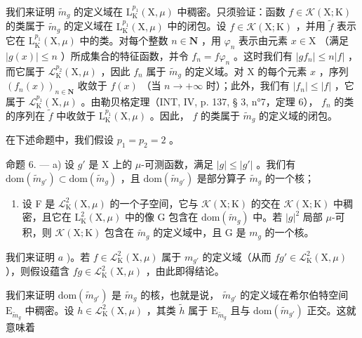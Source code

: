 我们来证明 \(\widetilde{m}_g\) 的定义域在 \(\mathrm{L}_{\mathrm{K}}^{p_1}(\mathrm{X},\mu)\) 中稠密。只须验证：函数 \(f\in \mathcal{K}(\mathrm{X};\mathrm{K})\) 的类属于 \(\widetilde{m}_g\) 的定义域在 \(\mathrm{L}_{\mathrm{K}}^{p_1}(\mathrm{X},\mu)\) 中的闭包。设 \(f\in \mathcal{K}(\mathrm{X};\mathrm{K})\) ，并用 \(\widetilde{f}\) 表示它在 \(\mathrm{L}_{\mathrm{K}}^{p_1}(\mathrm{X},\mu)\) 中的类。对每个整数 \(n\in \mathbf{N}\) ，用 \(\varphi_{n}\) 表示由元素 \(x\in \mathrm{X}\) （满足 \(|g(x)|\leqslant n\) ）所成集合的特征函数，并令 \(f_{n} = f\varphi_{n}\) 。这时我们有 \(|gf_n|\leqslant n|f|\) ，而它属于 \(\mathcal{L}_{\mathrm{K}}^{p_2}(\mathrm{X},\mu)\) ，因此 \(f_{n}\) 属于 \(\widetilde{m}_g\) 的定义域。对 X 的每个元素 \(x\) ，序列 \((f_n(x))_{n\in \mathbf{N}}\) 收敛于 \(f(x)\) （当 \(n\to +\infty\) 时）；此外，我们有 \(|f_n|\leqslant |f|\) ，它属于 \(\mathcal{L}_{\mathrm{K}}^{p_1}(\mathrm{X},\mu)\) 。由勒贝格定理（INT, IV, p. 137, § 3, n°7，定理 6）， \(f_{n}\) 的类的序列在 \(\widetilde{f}\) 中收敛于 \(\mathrm{L}_{\mathrm{K}}^{p_1}(\mathrm{X},\mu)\) 。因此， \(f\) 的类属于 \(\widetilde{m}_g\) 的定义域的闭包。

在下述命题中，我们假设 \(p_1 = p_2 = 2\) 。

命题 6. --- a) 设 \(g'\) 是 X 上的 \(\mu\)-可测函数，满足 \(|g|\leqslant |g'|\) 。我们有 \(\mathrm{dom}(\widetilde{m}_{g'})\subset\mathrm{dom}(\widetilde{m}_{g})\) ，且 \(\mathrm{dom}(\widetilde{m}_{g'})\) 是部分算子 \(\widetilde{m}_{g}\) 的一个核；

\begin{enumerate}
\def\labelenumi{\alph{enumi})}
\setcounter{enumi}{1}
\tightlist
\item
  设 F 是 \(\mathcal{L}_{\mathrm{K}}^{2}(\mathrm{X},\mu)\) 的一个子空间，它与 \(\mathcal{K}(\mathrm{X};\mathrm{K})\) 的交在 \(\mathcal{K}(\mathrm{X};\mathrm{K})\) 中稠密，且它在 \(\mathrm{L}_{\mathrm{K}}^{2}(\mathrm{X},\mu)\) 中的像 G 包含在 \(\mathrm{dom}(\widetilde{m}_g)\) 中。若 \(|g|^2\) 局部 \(\mu\)-可积，则 \(\mathcal{K}(\mathrm{X};\mathrm{K})\) 包含在 \(\widetilde{m}_g\) 的定义域中，且 G 是 \(m_g\) 的一个核。
\end{enumerate}

我们来证明 \(a\) )。若 \(f \in \mathcal{L}_{\mathrm{K}}^{2}(\mathrm{X}, \mu)\) 属于 \(m_{g'}\) 的定义域（从而 \(fg' \in \mathcal{L}_{\mathrm{K}}^{2}(\mathrm{X}, \mu)\) ），则假设蕴含 \(fg \in \mathcal{L}_{\mathrm{K}}^{2}(\mathrm{X}, \mu)\) ，由此即得结论。

我们来证明 \(\mathrm{dom}(\widetilde{m}_{g'})\) 是 \(\widetilde{m}_g\) 的核，也就是说， \(\widetilde{m}_{g'}\) 的定义域在希尔伯特空间 \(\mathrm{E}_{\widetilde{m}_g}\) 中稠密。设 \(h \in \mathcal{L}_{\mathrm{K}}^2(\mathrm{X}, \mu)\) ，其类 \(\widetilde{h}\) 属于 \(\mathrm{E}_{\widetilde{m}_g}\) 且与 \(\mathrm{dom}(\widetilde{m}_{g'})\) 正交。这就意味着

